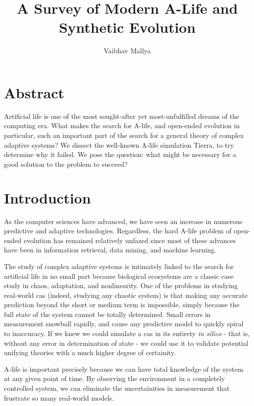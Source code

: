 \documentclass{article}
\begin{document}
\title{A Survey of Modern A-Life and Synthetic Evolution}
\author{Vaibhav Mallya}
\maketitle
\section{Abstract}

Artificial life is one of the most sought-after yet most-unfulfilled dreams of the computing era.
What makes the search for A-life, and open-ended evolution in particular, such an important part of the search for a general theory of complex adaptive systems?
We dissect the well-known A-life simulation Tierra, to try determine why it failed. We pose the question: what might be necessary for a good solution to the problem to succeed?

\section{Introduction}
As the computer sciences have advanced, we have seen an increase in numerous predictive and adaptive technologies. Regardless, the hard A-life problem of open-ended evolution has remained relatively unfazed since most of these advances have been in information retrieval, data mining, and machine learning.

The study of complex adaptive systems is intimately linked to the search for artificial life in no small part because biological ecosystems are a classic case study in chaos, adaptation, and nonlinearity. One of the problems in studying real-world cas (indeed, studying any chaotic system) is that making any accurate prediction beyond the short or medium term is impossible, simply because the full state of the system cannot be totally determined. 
Small errors in measurement snowball rapidly, and cause any predictive model to quickly spiral to inaccuracy. If we knew we could simulate a cas in its entirety \emph{in silico} - that is, without any error in determination of state - we could use it to validate potential unifying theories with a much higher degree of certainity.

A-life is important precisely because we can have total knowledge of the system at any given point of time. By observing the environment in a completely controlled system, we can eliminate the uncertainities in measurement that frustrate so many real-world models. 
\end{document}
